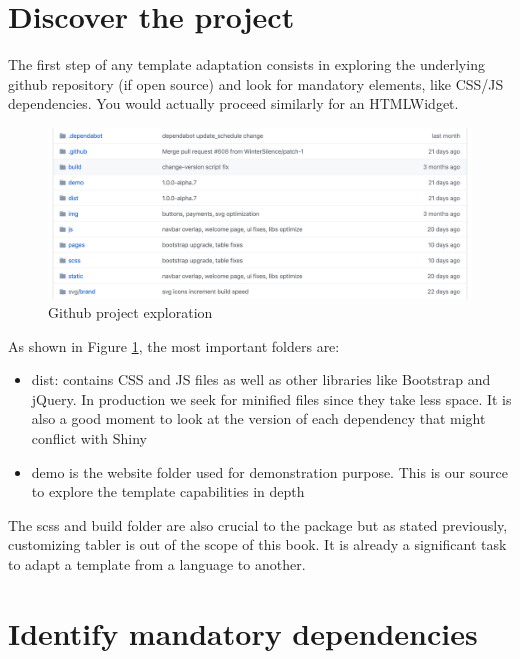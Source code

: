 \documentclass[]{book}
\providecommand{\tightlist}{%
  \setlength{\itemsep}{0pt}\setlength{\parskip}{0pt}}
\begin{document}
\hypertarget{discover-the-project}{%
\section{Discover the project}\label{discover-the-project}}

The first step of any template adaptation consists in exploring the underlying github repository (if open source) and look for mandatory elements, like CSS/JS dependencies. You would actually proceed similarly for an HTMLWidget.

\begin{figure}
\includegraphics[width=32.03in]{images/practice/tabler-github} \caption{Github project exploration}\label{fig:tabler-github}
\end{figure}

As shown in Figure \ref{fig:tabler-github}, the most important folders are:

\begin{itemize}
\tightlist
\item
  dist: contains CSS and JS files as well as other libraries like Bootstrap and jQuery. In production we seek for minified files since they take less space. It is also a good moment to look at the version of each dependency that might conflict with Shiny
\item
  demo is the website folder used for demonstration purpose. This is our source to explore the template capabilities in depth
\end{itemize}

The scss and build folder are also crucial to the package but as stated previously, customizing tabler is out of the scope of this book. It is already a significant task to adapt a template from a language to another.

\hypertarget{identify-mandatory-dependencies}{%
\section{Identify mandatory dependencies}\label{identify-mandatory-dependencies}}
\end{document}
